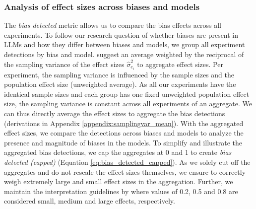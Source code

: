 \subsubsection{Analysis of effect sizes across biases and models}
\label{methodologies:analysisbiasmodels}
\par The \textit{bias detected} metric allows us to compare the bias effects across all experiments. To follow our research question of whether biases are present in LLMs and how they differ between biases and models, we group all experiment detections by bias and model. \textcite{morris2002combining} suggest an average weighted by the reciprocal of the sampling variance of the effect sizes $\hat{\sigma}^2_{e_{i}}$ to aggregate effect sizes. Per experiment, the sampling variance is influenced by the sample sizes and the population effect size (unweighted average). As all our experiments have the identical sample sizes and each group has one fixed unweighted population effect size, the sampling variance is constant across all experiments of an aggregate. We can thus directly average the effect sizes to aggregate the bias detections (derivations in Appendix \ref{appendix:samplingvar_mean}). With the aggregated effect sizes, we compare the detections across biases and models to analyze the presence and magnitude of biases in the models. To simplify and illustrate the aggregated bias detections, we cap the aggregates at 0 and 1 to create \textit{bias detected (capped)} (Equation \ref{eq:bias_detected_capped}). As we solely cut off the aggregates and do not rescale the effect sizes themselves, we ensure to correctly weigh extremely large and small effect sizes in the aggregation. Further, we maintain the interpretation guidelines by \textcite{cohen1988statistical} where values of 0.2, 0.5 and 0.8 are considered small, medium and large effects, respectively.

